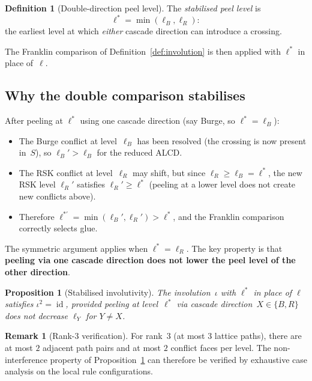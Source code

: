 \documentclass[11pt]{article}
\DeclareMathOperator{\id}{id}
\theoremstyle{plain}
\newtheorem{proposition}[theorem]{Proposition}
\theoremstyle{definition}
\newtheorem{definition}[theorem]{Definition}
\newtheorem{remark}[theorem]{Remark}
\begin{document}
\begin{definition}[Double-direction peel level]
\label{def:double-peel}
The \emph{stabilised peel level} is
\[
  \ell^* = \min(\ell_B, \ell_R):
\]
the earliest level at which \emph{either} cascade
direction can introduce a crossing.
\end{definition}

The Franklin comparison of Definition~\ref{def:involution}
is then applied with $\ell^*$ in place of~$\ell$.

\subsection{Why the double comparison stabilises}

After peeling at $\ell^*$ using one cascade direction
(say Burge, so $\ell^* = \ell_B$):
\begin{itemize}
  \item The Burge conflict at level~$\ell_B$ has been
    resolved (the crossing is now present in~$S$), so
    $\ell_B' > \ell_B$ for the reduced ALCD.
  \item The RSK conflict at level~$\ell_R$ may shift,
    but since $\ell_R \geq \ell_B = \ell^*$, the new RSK
    level $\ell_R'$ satisfies $\ell_R' \geq \ell^*$
    (peeling at a lower level does not create new
    conflicts above).
  \item Therefore $\ell^{*\prime} = \min(\ell_B',
    \ell_R') > \ell^*$, and the Franklin comparison
    correctly selects glue.
\end{itemize}

\noindent
The symmetric argument applies when $\ell^* = \ell_R$.
The key property is that \textbf{peeling via one cascade
direction does not lower the peel level of the other
direction}.

\begin{proposition}[Stabilised involutivity]
\label{prop:stabilised}
The involution~$\iota$ with $\ell^*$ in place of $\ell$
satisfies $\iota^2 = \id$, provided peeling at
level~$\ell^*$ via cascade direction~$X \in \{B, R\}$
does not decrease $\ell_Y$ for $Y \neq X$.
\end{proposition}

\begin{remark}[Rank-$3$ verification]
\label{rem:rank3}
For rank~$3$ (at most $3$ lattice paths), there are at
most $2$ adjacent path pairs and at most $2$ conflict
faces per level.  The non-interference property of
Proposition~\ref{prop:stabilised} can therefore be
verified by exhaustive case analysis on the local rule
configurations.
\end{remark}
\end{document}
